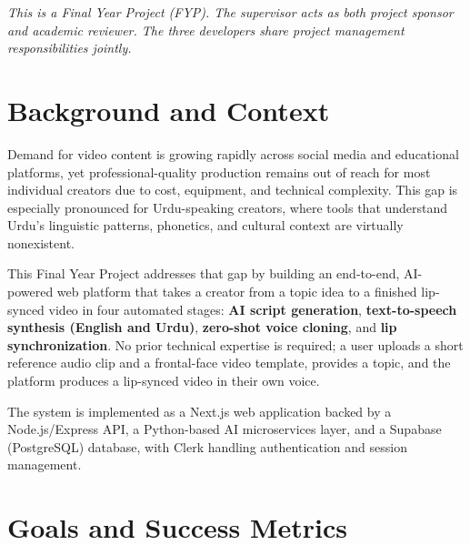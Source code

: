 ﻿\documentclass[12pt, a4paper]{article}
\begin{document}
\vspace{4pt}
{\small\color{darkgray}\itshape
  This is a Final Year Project (FYP). The supervisor acts as both project
  sponsor and academic reviewer. The three developers share project management
  responsibilities jointly.}

\section{Background and Context}

Demand for video content is growing rapidly across social media and educational
platforms, yet professional-quality production remains out of reach for most
individual creators due to cost, equipment, and technical complexity. This gap
is especially pronounced for Urdu-speaking creators, where tools that understand
Urdu's linguistic patterns, phonetics, and cultural context are virtually
nonexistent.

This Final Year Project addresses that gap by building an end-to-end,
AI-powered web platform that takes a creator from a topic idea to a finished
lip-synced video in four automated stages: \textbf{AI script generation},
\textbf{text-to-speech synthesis (English and Urdu)}, \textbf{zero-shot voice
cloning}, and \textbf{lip synchronization}. No prior technical expertise is
required; a user uploads a short reference audio clip and a frontal-face video
template, provides a topic, and the platform produces a lip-synced video in
their own voice.

The system is implemented as a Next.js web application backed by a
Node.js/Express API, a Python-based AI microservices layer, and a Supabase
(PostgreSQL) database, with Clerk handling authentication and session management.

\section{Goals and Success Metrics}
\end{document}
